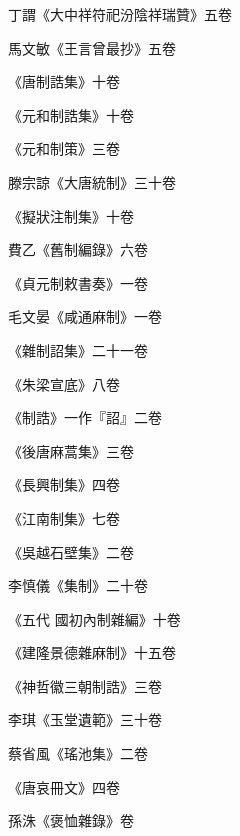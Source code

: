 \begin{pinyinscope}
 丁謂《大中祥符祀汾陰祥瑞贊》五卷



 馬文敏《王言曾最抄》五卷



 《唐制誥集》十卷



 《元和制誥集》十卷



 《元和制策》三卷



 滕宗諒《大唐統制》三十卷



 《擬狀注制集》十卷



 費乙《舊制編錄》六卷



 《貞元制敕書奏》一卷



 毛文晏《咸通麻制》一卷



 《雜制詔集》二十一卷



 《朱梁宣底》八卷



 《制誥》一作『詔』二卷



 《後唐麻蒿集》三卷



 《長興制集》四卷



 《江南制集》七卷



 《吳越石壁集》二卷



 李慎儀《集制》二十卷



 《五代
 國初內制雜編》十卷



 《建隆景德雜麻制》十五卷



 《神哲徽三朝制誥》三卷



 李琪《玉堂遺範》三十卷



 蔡省風《瑤池集》二卷



 《唐哀冊文》四卷



 孫洙《褒恤雜錄》卷




\end{pinyinscope}
